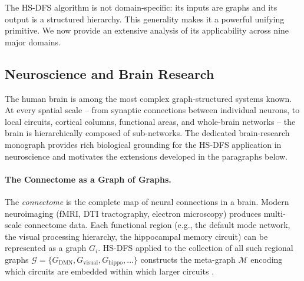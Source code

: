 ﻿\documentclass[12pt,a4paper]{article}
\theoremstyle{plain}
\theoremstyle{definition}
\theoremstyle{remark}
\begin{document}
	The HS-DFS algorithm is not domain-specific: its inputs are graphs and its
	output is a structured hierarchy.  This generality makes it a powerful
	unifying primitive.  We now provide an extensive analysis of its applicability
	across nine major domains.
	
	\subsection{Neuroscience and Brain Research}
	\label{sec:brain}
	
	The human brain is among the most complex graph-structured systems known.
	At every spatial scale -- from synaptic connections between individual neurons,
	to local circuits, cortical columns, functional areas, and whole-brain
	networks -- the brain is hierarchically composed of sub-networks.
	The dedicated brain-research monograph \cite{epp2026brain} provides
	rich biological grounding for the HS-DFS application in neuroscience and
	motivates the extensions developed in the paragraphs below.
	
	\paragraph{The Connectome as a Graph of Graphs.}
	The \emph{connectome} is the complete map of neural connections in a brain.
	Modern neuroimaging (fMRI, DTI tractography, electron microscopy) produces
	multi-scale connectome data.  Each functional region (e.g., the default mode
	network, the visual processing hierarchy, the hippocampal memory circuit) can
	be represented as a graph $G_i$.  HS-DFS applied to the collection of all
	such regional graphs $\mathcal{G} = \{G_{\text{DMN}}, G_{\text{visual}},
	G_{\text{hippo}}, \ldots\}$ constructs the meta-graph $\mathcal{M}$ encoding
	which circuits are embedded within which larger circuits \cite{sporns2011}.
	
\end{document}
